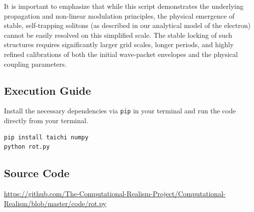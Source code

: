 \documentclass[12pt, a4paper]{article}
\begin{document}
It is important to emphasize that while this script demonstrates the underlying propagation and non-linear modulation principles, the physical emergence of stable, self-trapping solitons (as described in our analytical model of the electron) cannot be easily resolved on this simplified scale. The stable locking of such structures requires significantly larger grid scales, longer periods, and highly refined calibrations of both the initial wave-packet envelopes and the physical coupling parameters.

\subsection{Execution Guide}

Install the necessary dependencies via \texttt{pip} in your terminal and run the code directly from your terminal.

\begin{verbatim}
pip install taichi numpy
python rot.py
\end{verbatim}

\subsection{Source Code}
\url{https://github.com/The-Computational-Realism-Project/Computational-Realism/blob/master/code/rot.py}
\end{document}

